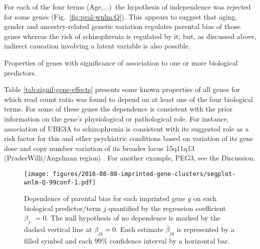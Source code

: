 \documentclass[letterpaper]{article}
\begin{document}
For each of the four terms (Age,...)~the hypothesis of independence was rejected for some genes
(Fig.~\ref{fig:pval-wnlm.Q}). This appears to suggest that aging, gender and ancestry-related genetic variation regulates
parental bias of those genes whereas the risk of schizophrenia is regulated by it; but, as discussed
above, indirect causation involving a latent variable is also possible.

\begin{table}
\footnotesize

\caption{
Properties of genes with significance of association to one or more biological predictors.
}
\label{tab:signif-gene-effects}
\end{table}

Table \ref{tab:signif-gene-effects} presents some known properties of all genes for which read count ratio was found
to depend on at least one of the four biological terms. For some of these genes the dependence
is consistent with the prior information on the gene's physiological or pathological role.
For instance, association of
UBE3A to schizophrenia is consistent with its suggested role as a risk factor for this and other
psychiatric conditions based on variation of its gene dose and copy number variation of its broader
locus 15q11q13 (PraderWilli/Angelman region) \cite{Sullivan2012,
McNamara2013}.  For another example, PEG3, see the Discussion.

\begin{figure}
\begin{center}
\texttt{[image: figures/2016-08-08-imprinted-gene-clusters/segplot-wnlm-Q-99conf-1.pdf]}
\end{center}
\caption{ 
Dependence of parental bias for each imprinted gene \(g\)
on each biological predictor/term \(j\) quantified by the regression coefficient
\(\beta_{j\cdot} = 0\).  The null hypothesis of no dependence is marked by the dashed
vertical line at \(\beta_{jg}=0\).  Each estimate \(\hat{\beta}_{jg}\) is
represented by a filled symbol and each 99\% confidence interval by a horizontal
bar.
}
\label{fig:biol-effects-wnlm.Q}
\end{figure}
\end{document}
